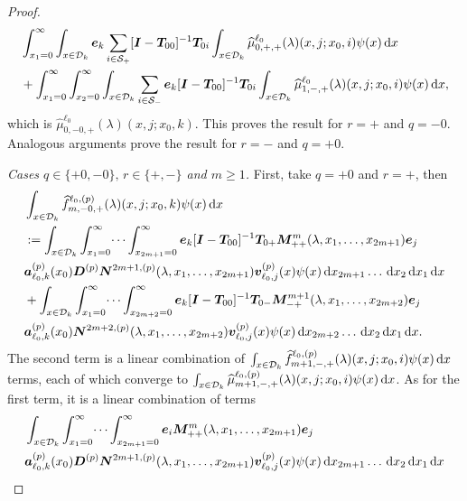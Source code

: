 \begin{proof}
	\begin{align}
		&\int_{x_1=0}^\infty \int_{x\in\mathcal{D}_k} \boldsymbol e_k \sum_{i\in\mathcal{S}_+} [\boldsymbol I - \boldsymbol T_{00}]^{-1}\boldsymbol T_{0i}\int_{x\in\mathcal{D}_k}\widehat{\mu}_{0,+,+}^{\ell_0}(\lambda)(x,j;x_0,i) \psi(x)\, \mathrm{d} x \nonumber
		\\& + \int_{x_1=0}^\infty\int_{x_2=0}^\infty \int_{x\in\mathcal{D}_k} \sum_{i\in\mathcal{S}_-}\boldsymbol e_k [\boldsymbol I - \boldsymbol T_{00}]^{-1}\boldsymbol T_{0i}\int_{x\in\mathcal{D}_k}\widehat{\mu}_{1,-,+}^{\ell_0}(\lambda)(x,j;x_0,i) \psi(x)\, \mathrm{d} x, \label{eqn: thm 1223B}
	\end{align}
	which is \(\widehat{\mu}_{0,-0,+}^{\ell_0}(\lambda)(x,j;x_0,k)\). This proves the result for \(r=+\) and \(q=-0\). Analogous arguments prove the result for \(r=-\) and \(q=+0\).

	\textit{Cases \(q\in\{+0,-0\},\,r \in \{+,-\}\) and \(m\geq 1\).} First, take \(q=+0\) and \(r=+\), then 
	\begin{align}
		&\int_{x\in\mathcal{D}_k}\widehat{f}_{m,-0,+}^{\ell_0,(p)}(\lambda)(x,j;x_0,k)\psi(x)\, \mathrm{d} x \nonumber 
		\\&:=\int_{x\in\mathcal{D}_k}\int_{x_1=0}^\infty \dots \int_{x_{2m+1}=0}^\infty   \boldsymbol e_k [\boldsymbol I - \boldsymbol T_{00}]^{-1}\boldsymbol T_{0+}\boldsymbol M^m_{++}(\lambda,x_1,\dots,x_{2m+1})\boldsymbol e_j \nonumber
		\\& \boldsymbol a_{\ell_0,k}^{(p)}(x_0) \boldsymbol D^{(p)} \boldsymbol N^{2m+1,(p)}(\lambda,x_1,\dots,x_{2m+1}) {\boldsymbol v}_{\ell_0,j}^{(p)}(x)\psi(x)\, \mathrm{d} x_{2m+1}\dots\, \mathrm{d} x_2 \, \mathrm{d} x_1  \, \mathrm{d} x\nonumber
		\\& + \int_{x\in\mathcal{D}_k}\int_{x_1=0}^\infty \dots \int_{x_{2m+2}=0}^\infty   \boldsymbol e_k [\boldsymbol I - \boldsymbol T_{00}]^{-1}\boldsymbol T_{0-}\boldsymbol M^{m+1}_{-+}(\lambda,x_1,\dots,x_{2m+2})\boldsymbol e_j \nonumber
		\\& \boldsymbol a_{\ell_0,k}^{(p)}(x_0)\boldsymbol N^{2m+2,(p)}(\lambda,x_1,\dots,x_{2m+2}) {\boldsymbol v}_{\ell_0,j}^{(p)}(x)\psi(x)\, \mathrm{d} x_{2m+2}\dots\, \mathrm{d} x_2 \, \mathrm{d} x_1 \, \mathrm{d} x.
	\end{align}
	The second term is a linear combination of \(\int_{x\in\mathcal{D}_k}\widehat{f}_{m+1,-,+}^{\ell_0,(p)}(\lambda)(x,j;x_0,i) \psi(x)\, \mathrm{d} x\) terms, each of which converge to \(\int_{x\in\mathcal{D}_k}\widehat{\mu}_{m+1,-,+}^{\ell_0,(p)}(\lambda)(x,j;x_0,i) \psi(x)\, \mathrm{d} x\).
	As for the first term, it is a linear combination of terms 
	\begin{align*}
		&\int_{x\in\calD_k}\int_{x_1=0}^\infty \dots \int_{x_{2m+1}=0}^\infty \bs e_i \bs M^m_{++}(\lambda,x_1,\dots,x_{2m+1})\bs e_j \nonumber
		\\& \bs a_{\ell_0,k}^{(p)}(x_0)\bs D^{(p)}\bs N^{2m+1,(p)}(\lambda,x_1,\dots,x_{2m+1}) {\bs v}_{\ell_0,j}^{(p)}(x)\psi(x)\wrt x_{2m+1}\dots\wrt x_2 \wrt x_1 \wrt x

\end{align*}
\end{proof}

